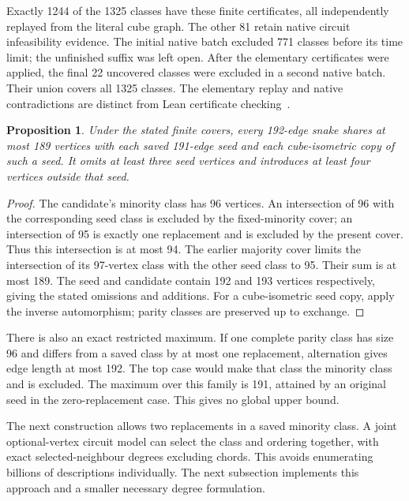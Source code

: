 \documentclass[11pt,a4paper]{article}
\newtheorem{proposition}[theorem]{Proposition}
\theoremstyle{definition}
\theoremstyle{remark}
\begin{document}
Exactly 1244 of the 1325 classes have these finite certificates, all
independently replayed from the literal cube graph. The other 81 retain
native circuit infeasibility evidence. The initial native batch excluded
771 classes before its time limit; the unfinished suffix was left open.
After the elementary certificates were applied, the final 22 uncovered
classes were excluded in a second native batch. Their union covers all
1325 classes. The elementary replay and native contradictions are
distinct from Lean certificate checking~\cite{research234}.

\begin{proposition}\label{prop:overlap234}
Under the stated finite covers, every 192-edge snake shares at most
189 vertices with each saved 191-edge seed and each cube-isometric
copy of such a seed. It omits at least three seed vertices and introduces
at least four vertices outside that seed.
\end{proposition}
\begin{proof}
The candidate's minority class has 96 vertices. An intersection of 96
with the corresponding seed class is excluded by the fixed-minority
cover; an intersection of 95 is exactly one replacement and is excluded
by the present cover. Thus this intersection is at most 94. The earlier
majority cover limits the intersection of its 97-vertex class with the
other seed class to 95. Their sum is at most 189. The seed and candidate
contain 192 and 193 vertices respectively, giving the stated omissions
and additions. For a cube-isometric seed copy, apply the inverse
automorphism; parity classes are preserved up to exchange.
\end{proof}

There is also an exact restricted maximum. If one complete parity class
has size 96 and differs from a saved class by at most one replacement,
alternation gives edge length at most 192. The top case would make that
class the minority class and is excluded. The maximum over this family is 191,
attained by an original seed in the zero-replacement case. This gives
no global upper bound.

The next construction allows two replacements in a saved minority
class. A joint optional-vertex circuit model can select the class and
ordering together, with exact selected-neighbour degrees excluding
chords. This avoids enumerating billions of descriptions individually.
The next subsection implements this approach and a smaller necessary
degree formulation.
\end{document}
